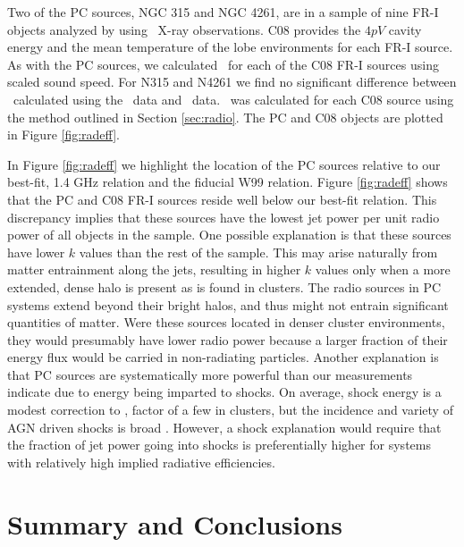 \documentclass[12pt, preprint]{aastex}
\begin{document}
Two of the PC sources, NGC 315 and NGC 4261, are in a sample of nine
FR-I objects analyzed by \citet[][hereafter C08]{2008MNRAS.386.1709C}
using \xmm\ X-ray observations. C08 provides the $4pV$ cavity energy
and the mean temperature of the lobe environments for each FR-I
source. As with the PC sources, we calculated \pcav\ for each of the
C08 FR-I sources using scaled sound speed. For N315 and N4261 we find
no significant difference between \pcav\ calculated using the
\chandra\ data and \xmm\ data. \phigh\ was calculated for each C08
source using the method outlined in Section \ref{sec:radio}. The PC
and C08 objects are plotted in Figure \ref{fig:radeff}.

In Figure \ref{fig:radeff} we highlight the location of the PC sources
relative to our best-fit, 1.4 GHz relation and the fiducial W99
relation. Figure \ref{fig:radeff} shows that the PC and C08 FR-I
sources reside well below our best-fit relation. This discrepancy
implies that these sources have the lowest jet power per unit radio
power of all objects in the sample. One possible explanation is that
these sources have lower $k$ values than the rest of the sample. This
may arise naturally from matter entrainment along the jets, resulting
in higher $k$ values only when a more extended, dense halo is present
as is found in clusters. The radio sources in PC systems extend beyond
their bright halos, and thus might not entrain significant quantities
of matter. Were these sources located in denser cluster environments,
they would presumably have lower radio power because a larger fraction
of their energy flux would be carried in non-radiating
particles. Another explanation is that PC sources are systematically
more powerful than our measurements indicate due to energy being
imparted to shocks. On average, shock energy is a modest correction to
\pcav, factor of a few in clusters, but the incidence and variety of
AGN driven shocks is broad \citep[\eg][]{2003ApJ...592..129K,
  hydraa}. However, a shock explanation would require that the
fraction of jet power going into shocks is preferentially higher for
systems with relatively high implied radiative efficiencies.

\section{Summary and Conclusions}
\label{sec:summary}
\end{document}
